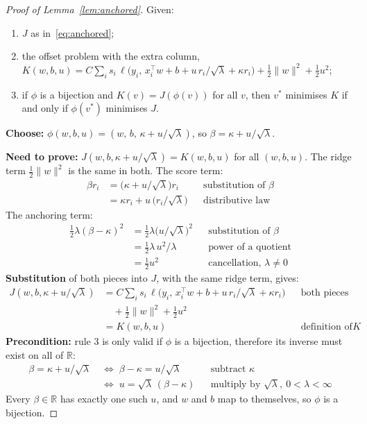 \documentclass{article}
\begin{document}
\begin{proof}[Proof of Lemma~\ref{lem:anchored}]
Given:
\begin{enumerate}
\item $J$ as in~\eqref{eq:anchored};
\item the offset problem with the extra column, $K(w,b,u) = C\sum_i s_i\,\ell\bigl(y_i,\, x_i^\top w + b + u\,r_i/\sqrt{\lambda} + \kappa r_i\bigr) + \tfrac{1}{2}\lVert w\rVert^2 + \tfrac{1}{2}u^2$;
\item if $\phi$ is a bijection and $K(v) = J(\phi(v))$ for all $v$, then $v^*$ minimises $K$ if and only if $\phi(v^*)$ minimises $J$.
\end{enumerate}

\textbf{Choose:} $\phi(w,b,u) = (w,\, b,\, \kappa + u/\sqrt{\lambda})$, so $\beta = \kappa + u/\sqrt{\lambda}$.

\textbf{Need to prove:} $J(w, b, \kappa + u/\sqrt{\lambda}) = K(w,b,u)$ for all $(w,b,u)$.
The ridge term $\tfrac{1}{2}\lVert w\rVert^2$ is the same in both. The score term:
\begin{align*}
\beta r_i &= \bigl(\kappa + u/\sqrt{\lambda}\bigr) r_i && \text{substitution of } \beta\\
          &= \kappa r_i + u\,\bigl(r_i/\sqrt{\lambda}\bigr) && \text{distributive law}
\end{align*}
The anchoring term:
\begin{align*}
\tfrac{1}{2}\lambda(\beta-\kappa)^2 &= \tfrac{1}{2}\lambda\bigl(u/\sqrt{\lambda}\bigr)^2 && \text{substitution of } \beta\\
                                   &= \tfrac{1}{2}\lambda\, u^2/\lambda && \text{power of a quotient}\\
                                   &= \tfrac{1}{2}u^2 && \text{cancellation, } \lambda \neq 0
\end{align*}
\textbf{Substitution} of both pieces into $J$, with the same ridge term, gives:
\begin{align*}
J(w, b, \kappa + u/\sqrt{\lambda}) &= C\sum_i s_i\,\ell\bigl(y_i,\, x_i^\top w + b + u\,r_i/\sqrt{\lambda} + \kappa r_i\bigr) && \text{both pieces}\\
                                   &\quad + \tfrac{1}{2}\lVert w\rVert^2 + \tfrac{1}{2}u^2 \\
                                   &= K(w, b, u) && \text{definition of } K
\end{align*}
\textbf{Precondition:} rule 3 is only valid if $\phi$ is a bijection, therefore its inverse must exist on all of $\mathbb{R}$:
\begin{align*}
\beta = \kappa + u/\sqrt{\lambda} \;&\Longleftrightarrow\; \beta - \kappa = u/\sqrt{\lambda} && \text{subtract } \kappa\\
                                    &\Longleftrightarrow\; u = \sqrt{\lambda}\,(\beta - \kappa) && \text{multiply by } \sqrt{\lambda},\ 0 < \lambda < \infty
\end{align*}
Every $\beta \in \mathbb{R}$ has exactly one such $u$, and $w$ and $b$ map to themselves, so $\phi$ is a bijection.


\end{proof}
\end{document}

